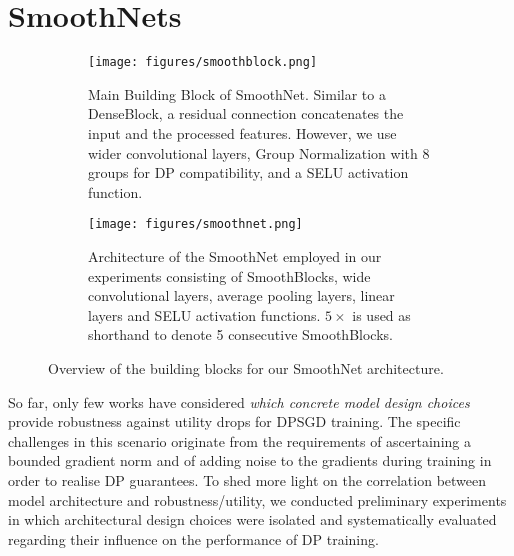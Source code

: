 \documentclass[nohyperref]{article}
\theoremstyle{plain}
\theoremstyle{definition}
\theoremstyle{remark}
\begin{document}
\section{SmoothNets}
\begin{figure*}[ht]
    \centering
    \begin{subfigure}[b]{\textwidth}
    \centering
    \texttt{[image: figures/smoothblock.png]}
    \caption{Main Building Block of SmoothNet. Similar to a DenseBlock, a residual connection concatenates the input and the processed features. However, we use wider convolutional layers, Group Normalization with 8 groups for DP compatibility, and a SELU activation function.}
    \label{fig:smoothblock}
    \end{subfigure}
    \begin{subfigure}[b]{\textwidth}
    \texttt{[image: figures/smoothnet.png]}
    \caption{Architecture of the SmoothNet employed in our experiments consisting of SmoothBlocks, wide convolutional layers, average pooling layers, linear layers and SELU activation functions. $5\times$ is used as shorthand to denote 5 consecutive SmoothBlocks.}
    \label{fig:smoothnet}
    \end{subfigure}
    \caption{Overview of the building blocks for our SmoothNet architecture.}
    \label{fig:architecture}
\end{figure*}
So far, only few works have considered \textit{which concrete model design choices} provide robustness against utility drops for \acs{DPSGD} training. The specific challenges in this scenario originate from the requirements of ascertaining a bounded gradient norm and of adding noise to the gradients during training in order to realise DP guarantees. To shed more light on the correlation between model architecture and robustness/utility, we conducted preliminary experiments in which architectural design choices were isolated and systematically evaluated regarding their influence on the performance of DP training. 
\end{document}
